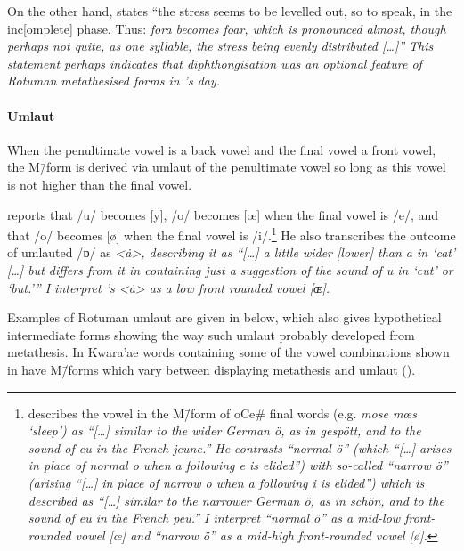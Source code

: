 On the other hand, \citet[86]{ch40} states
``the stress seems to be levelled out, so
to speak, in the inc[omplete] phase.
Thus: \it{fo}ra becomes \it{foar}, which is pronounced almost,
though perhaps not quite, as one syllable,
the stress being evenly distributed [\ldots]''
This statement perhaps indicates that diphthongisation
was an optional feature of Rotuman metathesised
forms in \citeauthor{ch40}'s day.

\paragraph{Umlaut}\label{sec:RotUml}
When the penultimate vowel is a back vowel and the final vowel a front vowel,
the M\=/form is derived via umlaut of the penultimate vowel
so long as this vowel is not higher than the final vowel.

\citet[79]{ch40} reports that /u/ becomes [y],
/o/ becomes [œ] when the final vowel is /e/,
and that /o/ becomes [ø] when the final vowel is /i/.\footnote{
	\cite{ch40} describes the vowel in the M\=/form of oCe{\#} final words
	(e.g. \it{mose} {\ra} \it{mœs} `sleep')
	as ``[\ldots] similar to the wider German \it{ö}, as in \it{gespött},
	and to the sound of \it{eu} in the French \it{jeune}.''
	He contrasts ``normal \it{ö}''  (which ``[\ldots]
	arises in place of normal \it{o} when a following \it{e} is elided'')
	with so-called ``narrow \it{ö}'' (arising ``[\ldots]
	in place of narrow \it{o} when a following \it{i} is elided'')
	which is described as ``[\ldots] similar to the narrower German \it{ö},
	as in \it{schön},
	and to the sound of \it{eu} in the French \it{peu}.''
	I interpret ``normal \it{ö}'' as a mid-low front-rounded vowel [œ]
	and ``narrow \it{ö}'' as a mid-high front-rounded vowel [ø].}
He also transcribes the outcome of umlauted /ɒ/ as \it{<\.a>},
describing it as ``[\ldots] a little wider [lower] than \it{a} in `cat' [\ldots]
but differs from it in containing just a suggestion of the sound of \it{u} in `cut' or `but.'{''}
I interpret \citeauthor{ch40}'s \it{<\.a>} as a low front rounded vowel [ɶ].

Examples of Rotuman umlaut are given in  below,
which also gives hypothetical intermediate forms
showing the way such umlaut probably developed from metathesis.
In Kwara'ae words containing some of the vowel combinations
shown in  have M\=/forms which
vary between displaying metathesis and umlaut ().

\begin{exe}
\label{RotUml-ch}
\end{exe}

